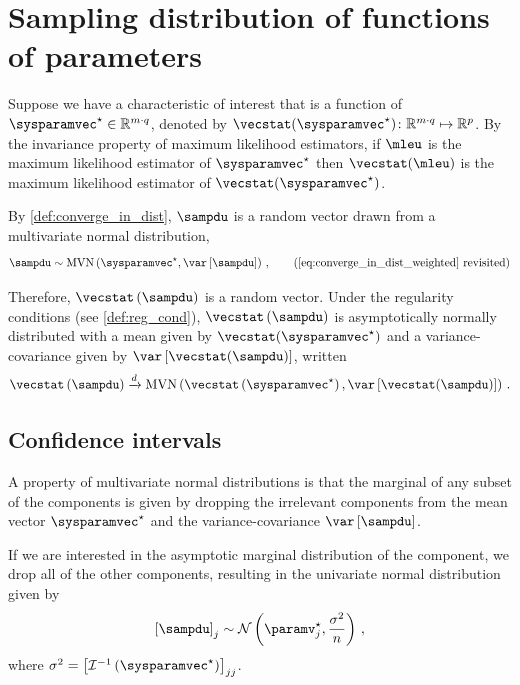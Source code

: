 \documentclass[../main.tex]{subfiles}
\begin{document}
\chapter{Sampling distribution of functions of parameters}
\label{sec:app}
Suppose we have a characteristic of interest that is a function of $\tparam\sysparamvec \in \mathbb{R}^{m \cdot q}$, denoted by $\vecstat(\tparam\sysparamvec) \colon \mathbb{R}^{m \cdot q} \mapsto \mathbb{R}^{p}$. By the invariance property of maximum likelihood estimators, if $\mleu$ is the maximum likelihood estimator of $\tparam\sysparamvec$ then $\vecstat(\mleu)$ is the maximum likelihood estimator of $\vecstat(\tparam\sysparamvec)$.

By \cref{def:converge_in_dist}, $\sampdu$ is a random vector drawn from a multivariate normal distribution,
\begin{equation*}
    \sampdu \sim \mvn\left(\tparam\sysparamvec, \var\left[\sampdu\right]\right)\,,
    \tag{\text{\ref{eq:converge_in_dist_weighted} revisited}}
\end{equation*}

Therefore, $\vecstat\left(\sampdu\right)$ is a random vector. Under the regularity conditions (see \cref{def:reg_cond}), $\vecstat\left(\sampdu\right)$ is asymptotically normally distributed with a mean given by $\vecstat(\tparam\sysparamvec)$ and a variance-covariance given by $\var\left[\vecstat(\sampdu)\right]$, written
\begin{equation}
\vecstat\left(\sampdu\right) \xrightarrow{d} \mvn\left(\vecstat\left(\tparam\sysparamvec\right), \var\left[\vecstat(\sampdu)\right]\right)\,.
\end{equation}

\section{Confidence intervals}
\label{sec:app:conf_interval}
A property of multivariate normal distributions is that the marginal of any subset of the components is given by dropping the irrelevant components from the mean vector $\tparam\sysparamvec$ and the variance-covariance $\var\left[\sampdu\right]$.

If we are interested in the asymptotic marginal distribution of the \jth component, we drop all of the other components, resulting in the univariate normal distribution given by
\begin{equation}
\label{eq:normal_marg}
    \left[\sampdu\right]_j \sim \mathcal{N}\left(\tparam\paramv_j, \frac{\sigma^2}{n}\right)\,,
\end{equation}
where $\sigma^2 = \left[\infomatrx^{-1}\left(\tparam\sysparamvec\right)\right]_{j j}$.
\end{document}
